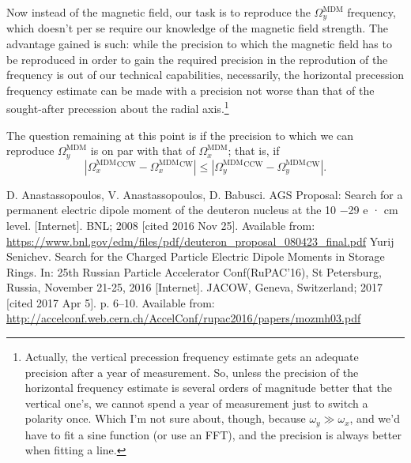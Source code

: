 \documentclass{article}
\newcommand{\W}{\Omega}
\newcommand{\w}{\omega}
\newcommand{\MDM}{^\mathrm{MDM}}
\newcommand{\CW}{^\mathrm{CW}}
\newcommand{\CCW}{^\mathrm{CCW}}
\begin{document}
Now instead of the magnetic field, our task is to reproduce the $\W_y\MDM$ frequency, which doesn't per se require our knowledge of the magnetic field strength. The advantage gained is such: while the precision to which the magnetic field has to be reproduced in order to gain the required precision in the reprodution of the frequency is out of our technical capabilities, necessarily, the horizontal precession frequency estimate can be made with a precision not worse than that of the sought-after precession about the radial axis.\footnote{Actually, the vertical precession frequency estimate gets an adequate precision after a year of measurement. So, unless the precision of the horizontal frequency estimate is several orders of magnitude better that the vertical one's, we cannot spend a year of measurement just to switch a polarity once. Which I'm not sure about, though, because $\w_y \gg \w_x$, and we'd have to fit a sine function (or use an FFT), and the precision is always better when fitting a line.}

The question remaining at this point is if the precision to which we can reproduce $\W_y\MDM$ is on par with that of $\W_x\MDM$; that is, if
\begin{equation}\label{eq:calibration_condition}
  |\W_x\MDM\CCW - \W_x\MDM\CW| \leq |\W_y\MDM\CCW - \W_y\MDM\CW|.
\end{equation}

\begin{thebibliography}{99}
  D. Anastassopoulos, V. Anastassopoulos, D. Babusci. AGS Proposal: Search for a permanent electric dipole moment of the deuteron nucleus at the 10 −29 e · cm level. [Internet]. BNL; 2008 [cited 2016 Nov 25]. Available from: \url{https://www.bnl.gov/edm/files/pdf/deuteron_proposal_080423_final.pdf}
  Yurij Senichev. Search for the Charged Particle Electric Dipole Moments in Storage Rings. In: 25th Russian Particle Accelerator Conf(RuPAC’16), St Petersburg, Russia, November 21-25, 2016 [Internet]. JACOW, Geneva, Switzerland; 2017 [cited 2017 Apr 5]. p. 6–10. Available from: \url{http://accelconf.web.cern.ch/AccelConf/rupac2016/papers/mozmh03.pdf}

\end{thebibliography}
\end{document}
